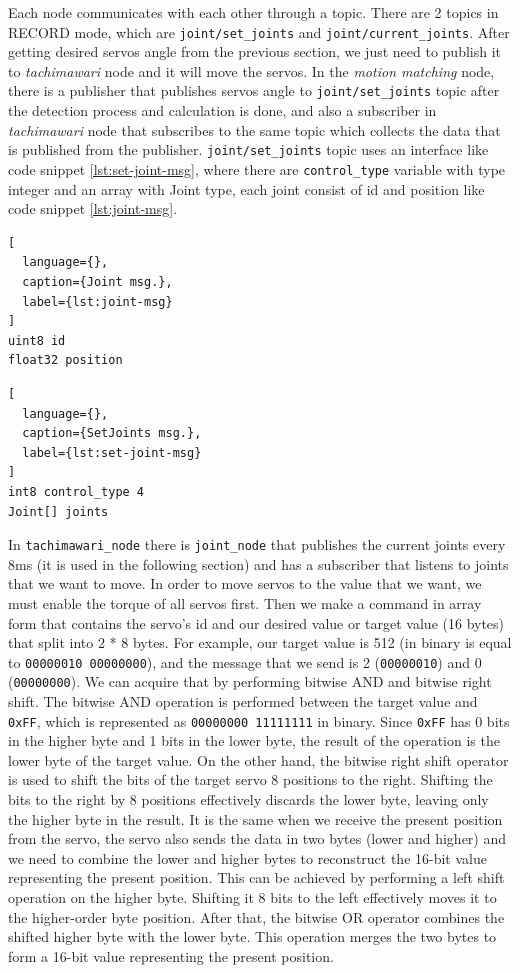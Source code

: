 Each node communicates with each other through a topic. There are 2 topics in RECORD mode, which are \verb|joint/set_joints| and \verb|joint/current_joints|. 
After getting desired servos angle from the previous section, we just need to publish it to \emph{tachimawari} node and it will move the servos. In the \emph{motion matching} node, there is a publisher that publishes servos angle to \verb|joint/set_joints| topic after the detection process and calculation is done, and also a subscriber in \emph{tachimawari} node that subscribes
to the same topic which collects the data that is published from the publisher. \verb|joint/set_joints| topic uses an interface like code snippet \ref{lst:set-joint-msg}, where there are \verb|control_type| variable with type integer and an array with Joint type, each joint consist of id and position like code snippet \ref{lst:joint-msg}.
\begin{lstlisting}[
  language={},
  caption={Joint msg.},
  label={lst:joint-msg}
]
uint8 id
float32 position
\end{lstlisting}

\begin{lstlisting}[
  language={},
  caption={SetJoints msg.},
  label={lst:set-joint-msg}
]
int8 control_type 4
Joint[] joints
\end{lstlisting}

In \verb|tachimawari_node| there is \verb|joint_node| that publishes the current joints every 8ms (it is used in the following section) and has a subscriber that listens to joints that we want to move. 
In order to move servos to the value that we want, we must enable the torque of all servos first. Then we make a command in array form that contains the servo's id and our desired value or target value (16 bytes) that split into 2 * 8 bytes.
For example, our target value is 512 (in binary is equal to \verb|00000010 00000000|), and the message that we send is 2 (\verb|00000010|) and 0 (\verb|00000000|). We can acquire that by performing bitwise AND and bitwise right shift. The bitwise AND operation is performed between the target value and \verb|0xFF|, which is represented as \verb|00000000 11111111| in binary.
Since \verb|0xFF| has 0 bits in the higher byte and 1 bits in the lower byte, the result of the operation is the lower byte of the target value. On the other hand, the bitwise right shift operator is used to shift the bits of the target servo 8 positions to the right. Shifting the bits to the right by 8 positions effectively discards the lower byte, leaving only the higher byte in the result.
It is the same when we receive the present position from the servo, the servo also sends the data in two bytes (lower and higher) and we need to combine the lower and higher bytes to reconstruct the 16-bit value representing the present position. This can be achieved by performing a left shift operation on the higher byte. Shifting it 8 bits to the left effectively moves it to the higher-order byte position.
After that, the bitwise OR operator combines the shifted higher byte with the lower byte. This operation merges the two bytes to form a 16-bit value representing the present position.


